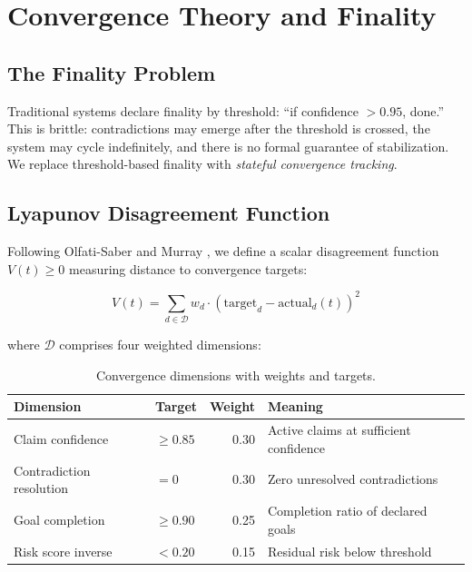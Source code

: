 \documentclass[11pt]{article}
\begin{document}
\section{Convergence Theory and Finality}

\subsection{The Finality Problem}

Traditional systems declare finality by threshold: ``if confidence $> 0.95$, done.'' This is brittle: contradictions may emerge after the threshold is crossed, the system may cycle indefinitely, and there is no formal guarantee of stabilization. We replace threshold-based finality with \emph{stateful convergence tracking}.

\subsection{Lyapunov Disagreement Function}

Following Olfati-Saber and Murray \cite{olfati2004}, we define a scalar disagreement function $V(t) \geq 0$ measuring distance to convergence targets:

\[
V(t) = \sum_{d \in \mathcal{D}} w_d \cdot (\text{target}_d - \text{actual}_d(t))^2
\]

where $\mathcal{D}$ comprises four weighted dimensions:

\begin{table}[H]
\centering
\begin{tabular}{llrl}
\toprule
\textbf{Dimension} & \textbf{Target} & \textbf{Weight} & \textbf{Meaning} \\
\midrule
Claim confidence & $\geq 0.85$ & 0.30 & Active claims at sufficient confidence \\
Contradiction resolution & $= 0$ & 0.30 & Zero unresolved contradictions \\
Goal completion & $\geq 0.90$ & 0.25 & Completion ratio of declared goals \\
Risk score inverse & $< 0.20$ & 0.15 & Residual risk below threshold \\
\bottomrule
\end{tabular}
\caption{Convergence dimensions with weights and targets.}
\label{tab:dimensions}
\end{table}
\end{document}
